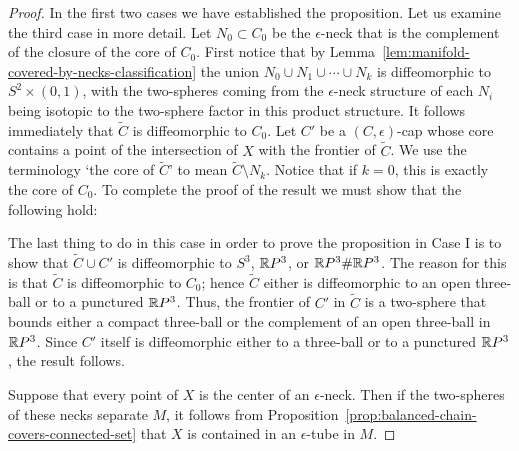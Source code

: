 \begin{proof}
In the first two cases we have established the proposition. Let us
examine the third case in more detail. Let $N_0\subset C_0$ be the
$\epsilon$-neck that is the complement of the closure of the core of
$C_0$.
 First notice that by
Lemma~\ref{lem:manifold-covered-by-necks-classification} the union $N_0\cup N_1\cup\cdots\cup N_k$ is
diffeomorphic to $S^2\times (0,1)$, with the two-spheres coming from
the $\epsilon$-neck structure of each $N_i$ being isotopic to the
two-sphere factor in this product structure. It follows immediately
that $\widetilde C$ is diffeomorphic to $C_0$. Let $C'$ be a
$(C,\epsilon)$-cap whose core contains a point of the intersection
of $X$ with the frontier of $\widetilde C$. We use the terminology
`the core of $\widetilde C$' to mean $\widetilde C\setminus N_k$.
Notice that if $k=0$, this is exactly the core of $C_0$. To complete
the proof of the result we must show that the following hold:

The last thing to do in this case in order to prove the proposition
in Case I is to show that $\widetilde C\cup C'$ is diffeomorphic to
$S^3$, $\mathbb{R} P^3$, or $\mathbb{R} P^3\#\mathbb{R} P^3$. The reason for this is that
$\widetilde C$ is diffeomorphic to $C_0$;  hence $\widetilde C$
either is diffeomorphic to an open three-ball or to a punctured $\mathbb{R}
P^3$. Thus, the frontier of $C'$ in $\widetilde C$ is a two-sphere
that bounds either a compact three-ball or the complement of an open
three-ball in $\mathbb{R} P^3$. Since $C'$ itself is diffeomorphic either
to a three-ball or to a punctured $\mathbb{R} P^3$, the result follows.

 Suppose that every point of $X$ is the
center of an $\epsilon$-neck. Then if the two-spheres of these necks
separate $M$, it follows from Proposition~\ref{prop:balanced-chain-covers-connected-set} that $X$
is contained in an $\epsilon$-tube in $M$.


\end{proof}
